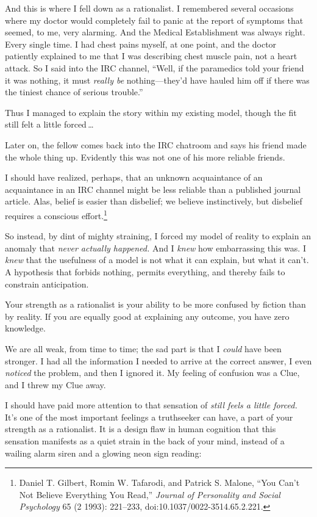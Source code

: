 {
 And this is where I fell down as a rationalist. I remembered
several occasions where my doctor would completely fail to panic at the
report of symptoms that seemed, to me, very alarming. And the Medical
Establishment was always right. Every single time. I had chest pains
myself, at one point, and the doctor patiently explained to me that I
was describing chest muscle pain, not a heart attack. So I said into
the IRC channel, ``Well, if the paramedics told your
friend it was nothing, it must \textit{really be}
nothing---they'd have hauled him off if there was the
tiniest chance of serious trouble.''}

{
 Thus I managed to explain the story within my existing model,
though the fit still felt a little forced\,\ldots}

{
 Later on, the fellow comes back into the IRC chatroom and says his
friend made the whole thing up. Evidently this was not one of his more
reliable friends.}

{
 I should have realized, perhaps, that an unknown acquaintance of
an acquaintance in an IRC channel might be less reliable than a
published journal article. Alas, belief is easier than disbelief; we
believe instinctively, but disbelief requires a conscious
effort.\footnote{Daniel T. Gilbert, Romin W. Tafarodi, and Patrick S. Malone,
``You Can't Not Believe Everything You
Read,'' \textit{Journal of Personality and Social
Psychology} 65 (2 1993): 221--233, doi:10.1037/0022-3514.65.2.221.}}

{
 So instead, by dint of mighty straining, I forced my model of
reality to explain an anomaly that \textit{never actually happened.}
And I \textit{knew} how embarrassing this was. I \textit{knew} that the
usefulness of a model is not what it can explain, but what it
can't. A hypothesis that forbids nothing, permits
everything, and thereby fails to constrain anticipation.}

{
 Your strength as a rationalist is your ability to be more confused
by fiction than by reality. If you are equally good at explaining any
outcome, you have zero knowledge.}

{
 We are all weak, from time to time; the sad part is that I
\textit{could} have been stronger. I had all the information I needed
to arrive at the correct answer, I even \textit{noticed} the problem,
and then I ignored it. My feeling of confusion was a Clue, and I threw
my Clue away.}

{
 I should have paid more attention to that sensation of
\textit{still feels a little forced.} It's one of the
most important feelings a truthseeker can have, a part of your strength
as a rationalist. It is a design flaw in human cognition that this
sensation manifests as a quiet strain in the back of your mind, instead
of a wailing alarm siren and a glowing neon sign reading:}

